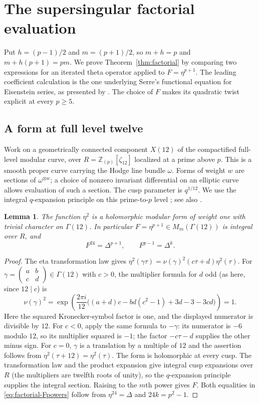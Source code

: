 \documentclass[11pt,a4paper]{article}
\numberwithin{equation}{section}
\newtheorem{lemma}[theorem]{Lemma}
\theoremstyle{definition}
\theoremstyle{remark}
\newcommand{\Z}{\mathbb Z}
\begin{document}
\section{The supersingular factorial evaluation}\label{sec:factorial}
Put $h=(p-1)/2$ and $m=(p+1)/2$, so $m+h=p$ and
$m+h(p+1)=pm$. We prove Theorem~\ref{thm:factorial} by comparing two
expressions for an iterated theta operator applied to $F=\eta^{p+1}$.
The leading coefficient calculation is the one underlying Serre's
functional equation for Eisenstein series, as presented by
\citet[\S2.5, Th\'eor\`eme~2, p.~119]{Robert80}. The choice of $F$ makes
its quadratic twist explicit at every $p\ge5$.

\subsection{A form at full level twelve}
Work on a geometrically connected component $X(12)$ of the compactified
full-level modular curve, over $R=\Z_{(p)}[\zeta_{12}]$ localized at a
prime above $p$. This is a smooth proper curve carrying the Hodge line
bundle $\omega$. Forms of weight $w$ are sections of $\omega^{\otimes w}$;
a choice of nonzero invariant differential on an elliptic curve allows
evaluation of such a section. The cusp parameter is $q^{1/12}$.
We use the integral $q$-expansion principle on this prime-to-$p$ level
\citep[\S1.6]{Katz73}; see also \citealp{DR73}.

\begin{lemma}\label{lem:eta-level12}
The function $\eta^2$ is a holomorphic modular form of weight one with
trivial character on $\Gamma(12)$. In particular
$F=\eta^{p+1}\in M_m(\Gamma(12))$ is integral over $R$, and
\begin{equation}\label{eq:factorial-Fpowers}
F^{24}=\Delta^{p+1},\qquad F^{p-1}=\Delta^k.
\end{equation}
\end{lemma}
\begin{proof}
The eta transformation law \citep[Ch.~4]{Knopp70} gives
$\eta^2(\gamma\tau)=\nu(\gamma)^2(c\tau+d)\eta^2(\tau)$.
For $\gamma=\begin{pmatrix}a&b\\c&d\end{pmatrix}\in\Gamma(12)$ with
$c>0$, the multiplier formula for $d$ odd (as here, since $12\mid c$) is
\[
\nu(\gamma)^2=
\exp\!\left(\frac{2\pi i}{12}
\bigl((a+d)c-bd(c^2-1)+3d-3-3cd\bigr)\right)=1.
\]
Here the squared Kronecker-symbol factor is one, and the displayed
numerator is divisible by $12$. For $c<0$, apply the same formula to
$-\gamma$: its numerator is $-6$ modulo $12$, so its multiplier squared
is $-1$; the factor $-c\tau-d$ supplies the other minus sign.
For $c=0$, $\gamma$ is a translation by a multiple of $12$ and the
assertion follows from $\eta^2(\tau+12)=\eta^2(\tau)$.
The form is holomorphic at every cusp. The transformation law and the
product expansion give integral cusp expansions over $R$ (the multipliers
are twelfth roots of unity), so the $q$-expansion principle supplies the
integral section. Raising to the $m$th power gives $F$.
Both equalities in \eqref{eq:factorial-Fpowers} follow from
$\eta^{24}=\Delta$ and $24k=p^2-1$.
\end{proof}
\end{document}
